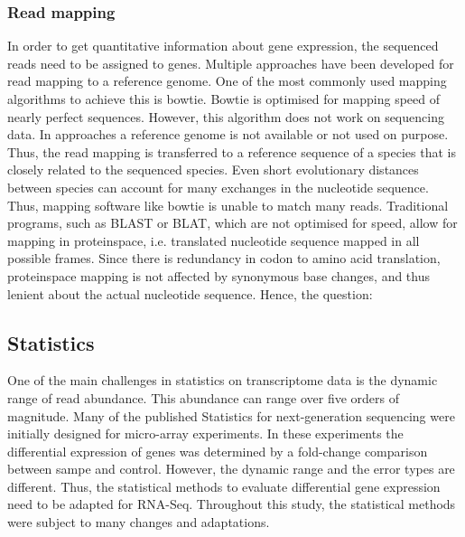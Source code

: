\subsubsection{Read mapping}
In order to get quantitative information about gene expression, the sequenced reads need to be assigned to genes.
Multiple approaches have been developed for read mapping to a reference genome.
One of the most commonly used mapping algorithms to achieve this is bowtie.
Bowtie is optimised for mapping speed of nearly perfect sequences.
However, this algorithm does not work on  sequencing data.
In  approaches a reference genome is not available or not used on purpose.
Thus, the read mapping is transferred to a reference sequence of a species that is closely related to the sequenced species.
Even short evolutionary distances between species can account for many exchanges in the nucleotide sequence.
Thus, mapping software like bowtie is unable to match many reads.
Traditional programs, such as BLAST or BLAT, which are not optimised for speed, allow for mapping in proteinspace, i.e. translated nucleotide sequence mapped in all possible frames.
Since there is redundancy in codon to amino acid translation, proteinspace mapping is not affected by synonymous base changes, and thus lenient about the actual nucleotide sequence.
Hence, the question:

\subsection{Statistics}
One of the main challenges in statistics on transcriptome data is the dynamic range of read abundance.
This abundance can range over five orders of magnitude.
Many of the published Statistics for next-generation sequencing were initially designed for micro-array experiments.
In these experiments the differential expression of genes was determined by a fold-change comparison between sampe and control.
However, the dynamic range and the error types are different.
Thus, the statistical methods to evaluate differential gene expression need to be adapted for RNA-Seq.
Throughout this study, the statistical methods were subject to many changes and adaptations.

